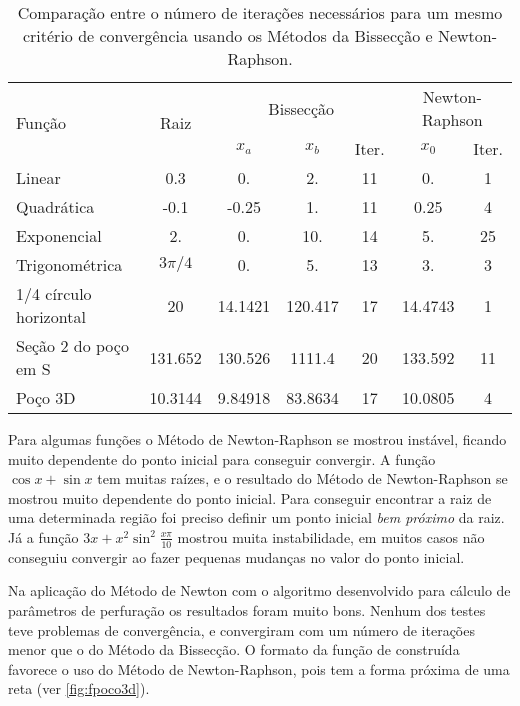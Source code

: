 \documentclass[final,3p,12pt]{elsarticle}
\begin{document}
    \begin{table}[h] 
        \centering
        \caption{Comparação entre o número de iterações necessários para um mesmo critério de convergência usando os Métodos da Bissecção e Newton-Raphson.}
        \begin{tabular}{ l c c c c c c }
            \multirow{2}{*}{Função} & \multirow{2}{*}{Raiz} & \multicolumn{3}{c}{Bissecção} & \multicolumn{2}{c}{Newton-Raphson} \\
              &  & $x_a$ & $x_b$ & Iter. & $x_0$ & Iter. \\ 
            \hline
            Linear & 0.3 & 0. & 2. &  11 & 0. & 1\\
            Quadrática & -0.1 & -0.25 & 1. & 11 & 0.25 & 4  \\
            Exponencial  & 2. & 0. & 10. & 14 & 5. & 25 \\
            Trigonométrica & $3\pi/4$ & 0. & 5. & 13 & 3. & 3  \\
            1/4 círculo horizontal & 20 & 14.1421 & 120.417 & 17 & 14.4743 & 1 \\
            Seção 2 do poço em S & 131.652 & 130.526 & 1111.4 & 20 & 133.592 & 11 \\
            Poço 3D & 10.3144 & 9.84918 & 83.8634 & 17 & 10.0805 & 4 \\
        \end{tabular}
        \label{table:iteracoes}
    \end{table}
    
    Para algumas funções o Método de Newton-Raphson se mostrou instável, ficando muito dependente do ponto inicial para conseguir convergir. A função $\cos x + \sin x$ tem muitas raízes, e o resultado do Método de Newton-Raphson se mostrou muito dependente do ponto inicial. Para conseguir encontrar a raiz de uma determinada região foi preciso definir um ponto inicial \emph{bem próximo} da raiz. Já a função $3x + x^2 \sin^2 \frac{x\pi}{10}$ mostrou muita instabilidade, em muitos casos não conseguiu convergir ao fazer pequenas mudanças no valor do ponto inicial.

    Na aplicação do Método de Newton com o algoritmo desenvolvido para cálculo de parâmetros de perfuração os resultados foram muito bons. Nenhum dos testes teve problemas de convergência, e convergiram com um número de iterações menor que o do Método da Bissecção. O formato da função de construída favorece o uso do Método de Newton-Raphson, pois tem a forma próxima de uma reta (ver \ref{fig:fpoco3d}).
\end{document}
